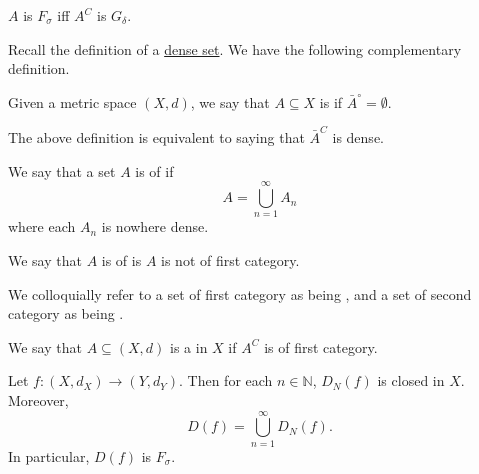 \documentclass[notoc,notitlepage]{tufte-book}
\begin{document}
\begin{remark}
  $A$ is $F_\sigma$ iff $A^C$ is $G_\delta$.
\end{remark}

Recall the definition of a \hyperref[defn:dense]{dense set}. We have the following complementary definition.

\begin{defn}\label{defn:nowhere_dense}
  Given a metric space $(X, d)$, we say that $A \subseteq X$ is  if $\bar{A}^\circ = \emptyset$.
\end{defn}

\begin{remark}
  The above definition is equivalent to saying that $\bar{A}^C$ is dense.
\end{remark}

\begin{defn}\label{defn:first_category}
  We say that a set $A$ is of  if
  \begin{equation*}
    A = \bigcup_{n=1}^{\infty} A_n
  \end{equation*}
  where each $A_n$ is nowhere dense.
\end{defn}

\begin{defn}\label{defn:second_category}
  We say that $A$ is of  is $A$ is not of first category.
\end{defn}

\begin{remark}
  We colloquially refer to a set of first category as being , and a set of second category as being .
\end{remark}

\begin{defn}[Residual]\label{defn:residual}
  We say that $A \subseteq (X, d)$ is a  in $X$ if $A^C$ is of first category.
\end{defn}

\begin{thm}\label{thm:set_of_points_of_discontinuity_is_f_sigma_}
  Let $f : (X, d_X) \to (Y, d_Y)$. Then for each $n \in \mathbb{N}$, $D_N(f)$ is closed in $X$. Moreover,
  \begin{equation*}
    D(f) = \bigcup_{n=1}^{\infty} D_N(f).
  \end{equation*}
  In particular, $D(f)$ is $F_\sigma$.
\end{thm}
\end{document}
